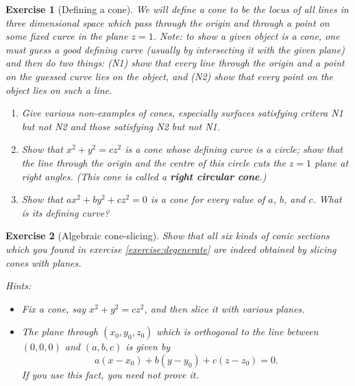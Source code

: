 \documentclass[a4paper,leqno,9pt]{article}
\theoremstyle{exercise}
\newtheorem{Exercise}{Exercise}
\newenvironment{exercise}
  {\begin{mdframed}\begin{Exercise}}
  {\end{Exercise}\end{mdframed}}
\theoremstyle{plain}
\theoremstyle{definition}
\theoremstyle{remark}
\newcommand{\df}{\textbf}
\begin{document}
\begin{exercise}[Defining a cone]
  We will define a cone to be the locus of all lines in three dimensional space which pass through the origin and through a point on some
  fixed curve in the plane $ z = 1 $. Note: to show a given object is a cone, one must guess a good defining curve (usually by intersecting
  it with the given plane) and then do two things: (N1) show that every line through the origin and a point on the guessed curve lies on the
  object, and (N2) show that every point on the object lies on such a line.
  \begin{enumerate}
    \item Give various non-examples of cones, especially surfaces satisfying critera N1 but not N2 and those satisfying N2 but not N1.
    \item Show that $ x^2 + y^2 = cz^2 $ is a cone whose defining curve is a circle; show that the line through the origin and the centre
          of this circle cuts the $ z = 1 $ plane at right angles. (This cone is called a \df{right circular cone}.)
    \item Show that $ ax^2 + by^2 + cz^2 = 0 $ is a cone for every value of $ a $, $ b $, and $ c $. What is its defining curve?
  \end{enumerate}
\end{exercise}

\begin{exercise}[Algebraic cone-slicing]
  Show that all six kinds of conic sections which you found in exercise \ref{exercise:degenerate} are indeed obtained by
  slicing cones with planes.

  \textit{Hints:}
  \begin{itemize}
    \item Fix a cone, say $ x^2 + y^2 = cz^2 $, and then slice it with various planes.
    \item The plane through $ (x_0, y_0, z_0) $ which is orthogonal to the line between $ (0,0,0) $ and $ (a,b,c) $ is given by
          \begin{displaymath}
            a(x-x_0) + b(y-y_0) + c(z-z_0) = 0.
          \end{displaymath}
          If you use this fact, you need not prove it.
  \end{itemize}
\end{exercise}
\end{document}
